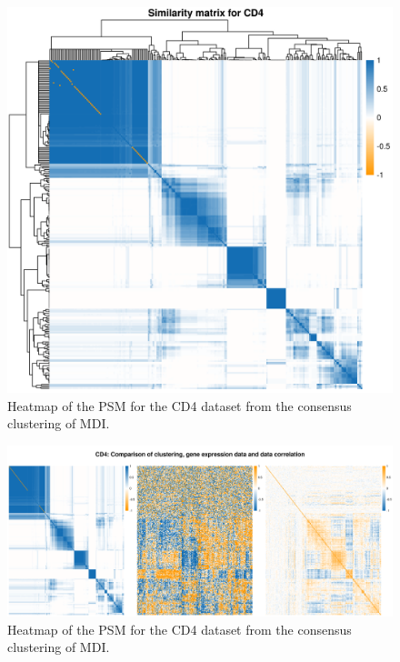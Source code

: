 \documentclass[12pt]{article} %
\begin{document}
	\newpage
	
	\begin{figure}[h]
		\centering
		\includegraphics[scale=0.75]{Images/Biology_data/All_datasets/Similarity_matrices/similarity_matrix_CD4.png}
		\caption{Heatmap of the PSM for the CD4 dataset from the consensus clustering of MDI.}
		\label{fig:mdi_cd4_psm}
	\end{figure}
	
	\newpage
	
	\begin{figure}
		\centering
		\includegraphics[scale=0.5]{Images/Biology_data/All_datasets/Comparison_expression_clustering_correlation/CD4.png}
		\caption{Heatmap of the PSM for the CD4 dataset from the consensus clustering of MDI.}
		\label{fig:mdi_cd4_psm_expr_cor}
	\end{figure}
\end{document}
